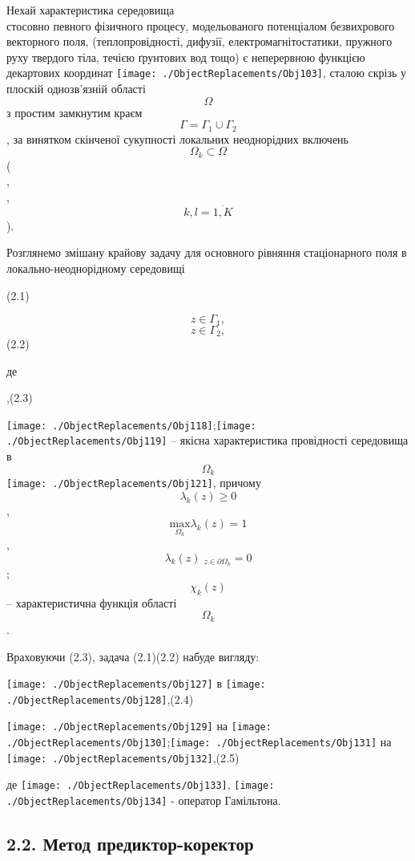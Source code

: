 Нехай характеристика середовища \[\] стосовно певного фізичного процесу,
модельованого потенціалом безвихрового векторного поля,
(теплопровідності, дифузії, електромагнітостатики, пружного руху
твердого тіла, течією ґрунтових вод тощо) є неперервною функцією
декартових координат
\texttt{[image: ./ObjectReplacements/Obj103]},
сталою скрізь у плоскій однозв'язній області \[\Omega{}\] з простим
замкнутим краєм \[{\Gamma = {\Gamma_{1} \cup \Gamma_{2}}}{}\], за
винятком скінченої сукупності локальних неоднорідних включень
\[{\Omega_{k}\subset\Omega}{}\] (\[\], \[\],
\[{k,{l = \overline{1,K}}}{}\]).

Розглянемо змішану крайову задачу для основного рівняння стаціонарного
поля в локально-неоднорідному середовищі

\[\] \[\](2.1)

\[\] \[{z\in\Gamma_{1},}{}\]\[\] \[{z\in\Gamma_{2},}{}\](2.2)

де

\[\] \[\],(2.3)

\texttt{[image: ./ObjectReplacements/Obj118]};\texttt{[image: ./ObjectReplacements/Obj119]}
-- якісна характеристика провідності середовища в
\[\Omega_{k}{}\]\texttt{[image: ./ObjectReplacements/Obj121]},
причому \[{\lambda_{k}{\left( z \right) \geq 0}}{}\],
\[{\underset{\Omega_{k}}{\text{max}}\lambda_{k}\left( z \right){= 1}}{}\],
\[{\lambda_{k}\left( z \right){_{z\in\partial\Omega_{k}} = 0}}{}\];
\[{\chi_{k}\left( z \right)}{}\] -- характеристична функція області
\[\Omega_{k}{}\].

Враховуючи (2.3), задача (2.1)(2.2) набуде вигляду:

\texttt{[image: ./ObjectReplacements/Obj127]}
в
\texttt{[image: ./ObjectReplacements/Obj128]},(2.4)

\texttt{[image: ./ObjectReplacements/Obj129]}
на
\texttt{[image: ./ObjectReplacements/Obj130]};\texttt{[image: ./ObjectReplacements/Obj131]}
на
\texttt{[image: ./ObjectReplacements/Obj132]},(2.5)

де
\texttt{[image: ./ObjectReplacements/Obj133]},
\texttt{[image: ./ObjectReplacements/Obj134]}
- оператор Гамільтона.

\hypertarget{ux43cux435ux442ux43eux434-ux43fux440ux435ux434ux438ux43aux442ux43eux440-ux43aux43eux440ux435ux43aux442ux43eux440}{%
\subsection[2.2. Метод
предиктор-коректор]{\texorpdfstring{\protect\hypertarget{anchor-30}{}{}2.2.
Метод
предиктор-коректор}{2.2. Метод предиктор-коректор}}\label{ux43cux435ux442ux43eux434-ux43fux440ux435ux434ux438ux43aux442ux43eux440-ux43aux43eux440ux435ux43aux442ux43eux440}}

